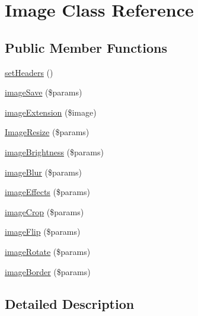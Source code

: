 \hypertarget{class_zest_1_1_image_1_1_image}{}\section{Image Class Reference}
\label{class_zest_1_1_image_1_1_image}
\subsection*{Public Member Functions}
\begin{DoxyCompactItemize}
\item 
\mbox{\hyperlink{class_zest_1_1_image_1_1_image_a85fdb47486cf604618635df0269a51d6}{set\+Headers}} ()
\item 
\mbox{\hyperlink{class_zest_1_1_image_1_1_image_a059243633a6de5f63a331aa0128de26a}{image\+Save}} (\$params)
\item 
\mbox{\hyperlink{class_zest_1_1_image_1_1_image_a7c9ed1b4d046d3b7048a341087912253}{image\+Extension}} (\$image)
\item 
\mbox{\hyperlink{class_zest_1_1_image_1_1_image_ad35abb3d08e6a33f1634bed36d90b3b6}{Image\+Resize}} (\$params)
\item 
\mbox{\hyperlink{class_zest_1_1_image_1_1_image_a57af33285ab49538a532b0891bc28794}{image\+Brightness}} (\$params)
\item 
\mbox{\hyperlink{class_zest_1_1_image_1_1_image_a396a84193e0d452555d48e21fa950faa}{image\+Blur}} (\$params)
\item 
\mbox{\hyperlink{class_zest_1_1_image_1_1_image_a3069cd92bc1230a0ecd5ac0a6dd24853}{image\+Effects}} (\$params)
\item 
\mbox{\hyperlink{class_zest_1_1_image_1_1_image_ac5079c30e25e4793c492478b097212fb}{image\+Crop}} (\$params)
\item 
\mbox{\hyperlink{class_zest_1_1_image_1_1_image_a8deb9e4b3f1858d4515dad7b6de856d2}{image\+Flip}} (\$params)
\item 
\mbox{\hyperlink{class_zest_1_1_image_1_1_image_a762c46642966686a6d012387b142b117}{image\+Rotate}} (\$params)
\item 
\mbox{\hyperlink{class_zest_1_1_image_1_1_image_a2bf10c2919bcc6feffc6acc80d5b1fb6}{image\+Border}} (\$params)
\end{DoxyCompactItemize}


\subsection{Detailed Description}


